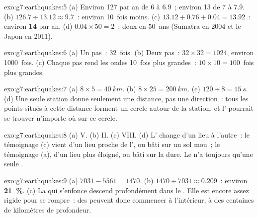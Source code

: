 \begin{solution}{exo:g7:earthquakes:5}
(a) Environ 127 par an de  6 à 6.9~; environ 13 de  7 à
7.9. (b) $126.7 \div 13.12 \approx 9.7$~: environ 10~fois moins. (c)
$13.12 + 0.76 + 0.04 = 13.92$~: environ \textbf{14} par an. (d)
$0.04 \times 50 = 2$~: deux en 50~ans (Sumatra en 2004 et le Japon en
2011).
\end{solution}

\begin{solution}{exo:g7:earthquakes:6}
(a) Un pas~: 32~fois. (b) Deux pas~: $32 \times 32 = 1024$, environ
1000~fois. (c) Chaque pas rend les ondes 10~fois plus grandes~: $10 \times 10 =
100$~fois plus grandes.
\end{solution}

\begin{solution}{exo:g7:earthquakes:7}
(a) $8 \times 5 = \qty{40}{km}$. (b) $8 \times 25 = \qty{200}{km}$. (c)
$120 \div 8 = \qty{15}{s}$. (d) Une seule station donne seulement une
distance, pas une direction~: tous les points situés à cette distance
forment un cercle autour de la station, et l' pourrait se trouver
n'importe où sur ce cercle.
\end{solution}

\begin{solution}{exo:g7:earthquakes:8}
(a) V. (b) II. (c) VIII. (d) L' change d'un lieu à l'autre~: le
témoignage (c) vient d'un lieu proche de l', ou bâti sur un sol
mou~; le témoignage (a), d'un lieu plus éloigné, ou bâti sur la 
dure. Le  n'a toujours qu'une seule .
\end{solution}

\begin{solution}{exo:g7:earthquakes:9}
(a) $7031 - 5561 = 1470$. (b) $1470 \div 7031 \approx 0.209$~: environ
\textbf{21~\%}. (c) La  qui s'enfonce descend profondément dans le
. Elle est encore assez rigide pour se rompre~: des  peuvent
donc commencer à l'intérieur, à des centaines de kilomètres de profondeur.
\end{solution}

